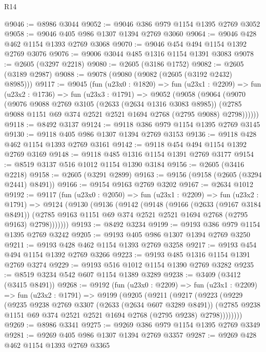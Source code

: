 \begin{lexlean}{R14}
\begin{coremodule}
@9046 := @8986 @3044
@9052 := @9046 @386 @979 @1154 @1395 @2769 @3052
@9058 := @9046 @405 @986 @1307 @1394 @2769 @3060
@9064 := @9046 @428 @462 @1154 @1393 @2769 @3068
@9070 := @9046 @454 @494 @1154 @1392 @2769 @3076
@9076 := @9006 @3044 @485 @1316 @1154 @1391 @3083
@9078 := @2605 (@3297 @2218)
@9080 := @2605 (@3186 @1752)
@9082 := @2605 (@3189 @2987)
@9088 := @9078 (@9080 (@9082 (@2605 (@3192 @2432) @8985)))
@9117 := @9045
    (fun (u23x0 : @1820) =>
    fun (u23x1 : @2209) =>
    fun (u23x2 : @1736) =>
    fun (u23x3 : @1791) =>
    @9052
      (@9058
        (@9064
          (@9070
            (@9076
              @9088
              @2769
              @3105
              (@2633 (@2634 @1316 @3083 @8985))
              (@2785 @9088 @1151 @69 @374 @2521 @2521 @1694 @2768 (@2795 @9088) @2798))))))
@9118 := @8492 @3137
@9124 := @9118 @386 @979 @1154 @1395 @2769 @3145
@9130 := @9118 @405 @986 @1307 @1394 @2769 @3153
@9136 := @9118 @428 @462 @1154 @1393 @2769 @3161
@9142 := @9118 @454 @494 @1154 @1392 @2769 @3169
@9148 := @9118 @485 @1316 @1154 @1391 @2769 @3177
@9154 := @8519 @3137 @516 @1012 @1154 @1390 @3184
@9156 := @2605 (@3416 @2218)
@9158 := @2605 (@3291 @2899)
@9163 := @9156 (@9158 (@2605 (@3294 @2441) @8491))
@9166 := @9154 @9163 @2769 @3202
@9167 := @2634 @1012
@9192 := @9117
    (fun (u23x0 : @2050) =>
    fun (u23x1 : @2209) =>
    fun (u23x2 : @1791) =>
    @9124
      (@9130
        (@9136
          (@9142
            (@9148
              (@9166
                (@2633 (@9167 @3184 @8491))
                (@2785 @9163 @1151 @69 @374 @2521 @2521 @1694 @2768 (@2795 @9163) @2798)))))))
@9193 := @8492 @3234
@9199 := @9193 @386 @979 @1154 @1395 @2769 @3242
@9205 := @9193 @405 @986 @1307 @1394 @2769 @3250
@9211 := @9193 @428 @462 @1154 @1393 @2769 @3258
@9217 := @9193 @454 @494 @1154 @1392 @2769 @3266
@9223 := @9193 @485 @1316 @1154 @1391 @2769 @3274
@9229 := @9193 @516 @1012 @1154 @1390 @2769 @3282
@9235 := @8519 @3234 @542 @607 @1154 @1389 @3289
@9238 := @3409 (@3412 (@3415 @8491))
@9268 := @9192
    (fun (u23x0 : @2209) =>
    fun (u23x1 : @2209) =>
    fun (u23x2 : @1791) =>
    @9199
      (@9205
        (@9211
          (@9217
            (@9223
              (@9229
                (@9235
                  @9238
                  @2769
                  @3307
                  (@2633 (@2634 @607 @3289 @8491))
                  (@2785 @9238 @1151 @69 @374 @2521 @2521 @1694 @2768 (@2795 @9238) @2798))))))))
@9269 := @8986 @3341
@9275 := @9269 @386 @979 @1154 @1395 @2769 @3349
@9281 := @9269 @405 @986 @1307 @1394 @2769 @3357
@9287 := @9269 @428 @462 @1154 @1393 @2769 @3365

\end{coremodule}
\end{lexlean}
